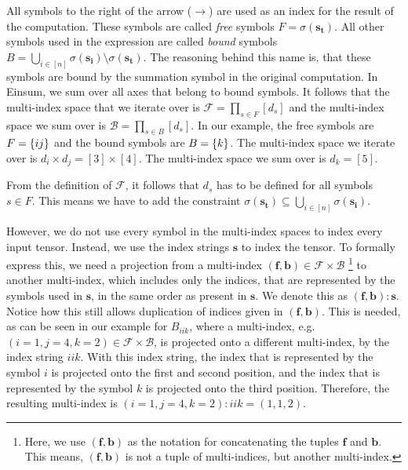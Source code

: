\begin{definition}
    All symbols to the right of the arrow ($\rightarrow$) are used as an index for the result of the computation.
    These symbols are called \textit{free} symbols $F = \sigma(\bm{s_t})$.
    All other symbols used in the expression are called \textit{bound} symbols $B = \bigcup_{i \in [n]} \sigma(\bm{s_i}) \setminus \sigma(\bm{s_t})$.
    The reasoning behind this name is, that these symbols are bound by the summation symbol in the original computation.
    In Einsum, we sum over all axes that belong to bound symbols.
    It follows that the multi-index space that we iterate over is $\mathcal{F} = \prod_{s \in F} [d_s]$ and the multi-index space we sum over is $\mathcal{B} = \prod_{s \in B} [d_s]$.
    In our example, the free symbols are $F = \lbrace ij \rbrace$ and the bound symbols are $B = \lbrace k \rbrace$.
    The multi-index space we iterate over is $d_i \times d_j = [3] \times [4]$.
    The multi-index space we sum over is $d_k = [5]$.

    From the definition of $\mathcal{F}$, it follows that $d_s$ has to be defined for all symbols $s \in F$.
    This means we have to add the constraint $\sigma(\bm{s_t}) \subseteq \bigcup_{i \in [n]} \sigma(\bm{s_i})$.

    However, we do not use every symbol in the multi-index spaces to index every input tensor.
    Instead, we use the index strings $\bm{s}$ to index the tensor.
    To formally express this, we need a projection from a multi-index $(\bm{f},\bm{b}) \in \mathcal{F} \times \mathcal{B}$
    \footnote{
        Here, we use $(\bm{f},\bm{b})$ as the notation for concatenating the tuples $\bm{f}$ and $\bm{b}$.
        This means, $(\bm{f},\bm{b})$ is not a tuple of multi-indices, but another multi-index.
    }
    to another multi-index, which includes only the indices, that are represented by the symbols used in $\bm{s}$,
    in the same order as present in $\bm{s}$.
    We denote this as $(\bm{f},\bm{b}):\bm{s}$.
    Notice how this still allows duplication of indices given in $(\bm{f},\bm{b})$.
    This is needed, as can be seen in our example for $B_{iik}$,
    where a multi-index, e.g. $(i=1,j=4,k=2) \in \mathcal{F} \times \mathcal{B}$, is projected onto a different multi-index, by the index string $iik$.
    With this index string, the index that is represented by the symbol $i$ is projected onto the first and second position,
    and the index that is represented by the symbol $k$ is projected onto the third position.
    Therefore, the resulting multi-index is $(i=1,j=4,k=2):iik = (1,1,2)$.


\end{definition}
